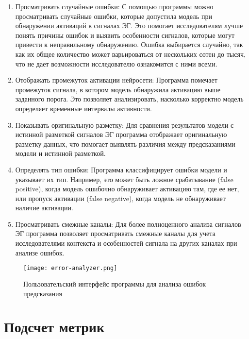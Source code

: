 \begin{enumerate}

	\item Просматривать случайные ошибки: С помощью программы можно
	просматривать случайные ошибки, которые допустила модель при обнаружении
	активаций в сигналах ЭГ. Это помогает исследователям лучше понять причины
	ошибок и выявить особенности сигналов, которые могут привести к
	неправильному обнаружению. Ошибка выбирается случайно, так как их общее
	количество может варьироваться от нескольких сотен до тысяч, что не дает
	возможности исследователю ознакомится с ними всеми.

	\item Отображать промежуток активации нейросети: Программа помечает
	промежуток сигнала, в котором модель обнаружила активацию выше заданного
	порога. Это позволяет анализировать, насколько корректно модель определяет
	временные интервалы активности.

	\item Показывать оригинальную разметку: Для сравнения результатов модели с
	истинной разметкой сигналов ЭГ программа отображает оригинальную разметку
	данных, что помогает выявлять различия между предсказаниями модели и
	истинной разметкой.

	\item Определять тип ошибки: Программа классифицирует ошибки модели и
	указывает их тип. Например, это может быть ложное срабатывание (false
	positive), когда модель ошибочно обнаруживает активацию там, где ее нет,
	или пропуск активации (false negative), когда модель не обнаруживает
	наличие активации.

	\item Просматривать смежные каналы: Для более полноценного анализа сигналов
	ЭГ программа позволяет просматривать смежные каналы для учета
	исследователями контекста и особенностей сигнала на других каналах при
	анализе ошибок.

\end{enumerate}


\begin{figure}[!htb]
	\centering
	\label{fig:error-analyser}
	\texttt{[image: error-analyzer.png]}
	\caption{Пользовательский интерфейс программы для анализа ошибок предсказания}
\end{figure}

\section{Подсчет метрик}

